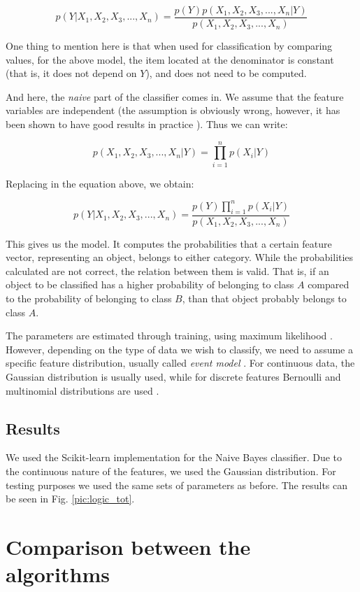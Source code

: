 \begin{equation*}
p(Y\vert X_1,X_2,X_3,..., X_n) = \frac{p(Y)p(X_1,X_2,X_3,..., X_n\vert Y)}{p(X_1,X_2,X_3,..., X_n)}
\end{equation*}

One thing to mention here is that when used for classification by comparing values, for the above model, the item located at the denominator is constant (that is, it does not depend on $Y$), and does not need to be computed. 

And here, the \textit{naive} part of the classifier comes in. We assume that the feature variables are independent (the assumption is obviously wrong, however, it has been shown to have good results in practice \cite{rish2001empirical}). Thus we can write:

\begin{equation*}
p(X_1,X_2,X_3,..., X_n\vert Y) = \prod_{i=1}^np(X_i \vert Y)
\end{equation*}

Replacing in the equation above, we obtain:

\begin{equation*}
p(Y\vert X_1,X_2,X_3,..., X_n) = \frac{p(Y)\prod \limits_{i=1}^np(X_i \vert Y)}{p(X_1,X_2,X_3,..., X_n)}
\end{equation*}

This gives us the model. It computes the probabilities that a certain feature vector, representing an object, belongs to either category. While the probabilities calculated are not correct, the relation between them is valid. That is, if an object to be classified has a higher probability of belonging to class $A$ compared to the probability of belonging to class $B$, than that object probably belongs to class $A$. 

The parameters are estimated through training, using maximum likelihood \cite{zhang2004optimality}. However, depending on the type of data we wish to classify, we need to assume a specific feature distribution, usually called \textit{event model} \cite{mccallum1998comparison}. For continuous data, the Gaussian distribution is usually used, while for discrete features Bernoulli and multinomial distributions are used \cite{mccallum1998comparison}.

\subsection{Results}

We used the Scikit-learn \cite{scikit-learn} implementation for the Naive Bayes classifier. Due to the continuous nature of the features, we used the Gaussian distribution. For testing purposes we used the same sets of parameters as before. The results can be seen in Fig. \ref{pic:logic_tot}.

\section {Comparison between the algorithms}